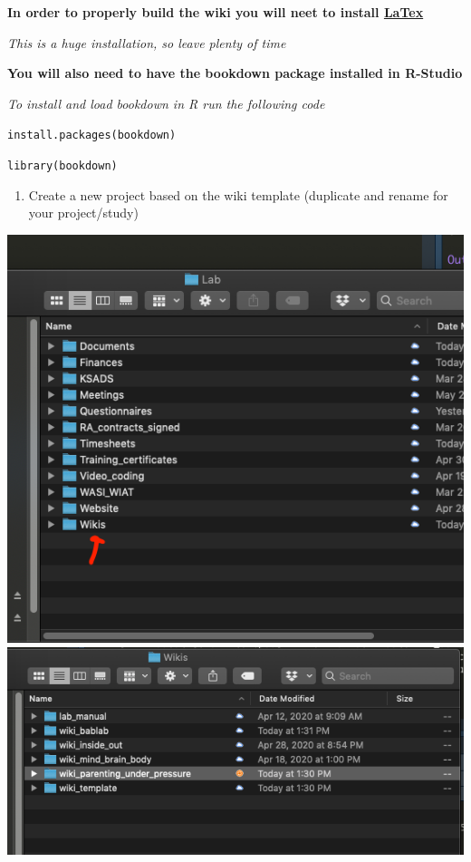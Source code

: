 \documentclass[]{book}
\providecommand{\tightlist}{%
  \setlength{\itemsep}{0pt}\setlength{\parskip}{0pt}}
\begin{document}
\textbf{In order to properly build the wiki you will neet to install \href{https://www.latex-project.org/}{LaTex}}

\emph{This is a huge installation, so leave plenty of time}

\textbf{You will also need to have the bookdown package installed in R-Studio}

\emph{To install and load bookdown in R run the following code}

\texttt{install.packages(\textquotesingle{}bookdown\textquotesingle{})}

\texttt{library(bookdown)}

\begin{enumerate}
\def\labelenumi{\arabic{enumi}.}
\tightlist
\item
  Create a new project based on the wiki template (duplicate and rename for your project/study)
\end{enumerate}

\includegraphics{images/research_protocols/wiki/1.png}
\includegraphics{images/research_protocols/wiki/2.png}
\end{document}
